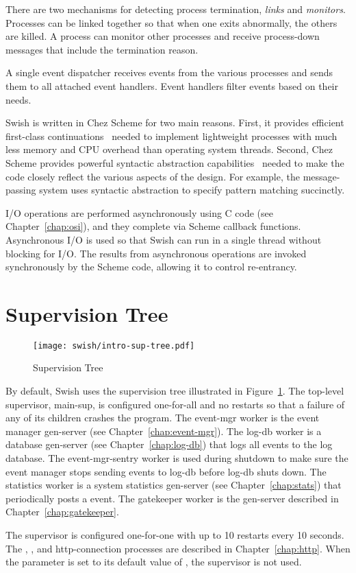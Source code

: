 There are two mechanisms for detecting process termination,
\emph{links} and \emph{monitors}. Processes can be linked together so
that when one exits abnormally, the others are killed. A process can
monitor other processes and receive process-down messages that include
the termination reason.

A single event dispatcher receives events from the various processes
and sends them to all attached event handlers.  Event handlers filter
events based on their needs.

Swish is written in Chez Scheme
for two main reasons. First, it provides efficient first-class
continuations~\cite{one-shot,representing-control} needed to implement
lightweight processes with much less memory and CPU overhead than
operating system threads.  Second, Chez Scheme provides powerful
syntactic abstraction capabilities~\cite{syntactic-abstraction} needed
to make the code closely reflect the various aspects of the
design. For example, the message-passing system uses syntactic
abstraction to specify pattern matching succinctly.

I/O operations are performed asynchronously using C code (see
Chapter~\ref{chap:osi}), and they complete via Scheme callback
functions. Asynchronous I/O is used so that Swish can run in a single
thread without blocking for I/O. The results from asynchronous
operations are invoked synchronously by the Scheme code, allowing it
to control re-entrancy.

\section {Supervision Tree}

\begin{figure}
  \center\texttt{[image: swish/intro-sup-tree.pdf]}
  \caption{\label{fig:intro-sup-tree}Supervision Tree}
\end{figure}

By default, Swish uses the supervision tree illustrated in
Figure~\ref{fig:intro-sup-tree}. The top-level supervisor, main-sup,
is configured one-for-all and no restarts so that a failure of any of
its children crashes the program. The event-mgr worker is the event
manager gen-server (see Chapter~\ref{chap:event-mgr}). The log-db
worker is a database gen-server (see Chapter~\ref{chap:log-db}) that
logs all events to the log database. The event-mgr-sentry worker is
used during shutdown to make sure the event manager stops sending
events to log-db before log-db shuts down. The statistics worker is a
system statistics gen-server (see Chapter~\ref{chap:stats}) that
periodically posts a  event.  The gatekeeper
worker is the gen-server described in Chapter~\ref{chap:gatekeeper}.

The  supervisor is configured one-for-one with up to 10
restarts every 10 seconds. The ,
, and http-connection processes are described in
Chapter~\ref{chap:http}. When the  parameter is
set to its default value of , the  supervisor
is not used.
